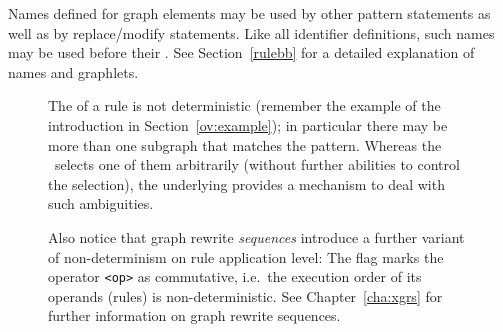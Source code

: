 Names defined for graph elements may be used by other pattern statements as well as by replace/modify statements.
Like all identifier definitions, such names may be used before their .
See Section~\ref{rulebb} for a detailed explanation of names and graphlets.
\begin{figure}[htbp]
\begin{warning}
\label{note:indeterminism}
The  of a rule is not deterministic (remember the example of the introduction in Section~\ref{ov:example}); in particular there may be more than one subgraph that matches the pattern.
Whereas the \GrShell\ selects one of them arbitrarily (without further abilities to control the selection), the underlying \LibGr{} provides a mechanism to deal with such ambiguities.

Also notice that graph rewrite \emph{sequences} introduce a further variant of non-determinism on rule application level:
The  flag marks the operator \texttt{<op>} as commutative, i.e.\ the execution order of its operands (rules) is non-deterministic.
See Chapter~\ref{cha:xgrs} for further information on graph rewrite sequences.
\end{warning}
\end{figure}


